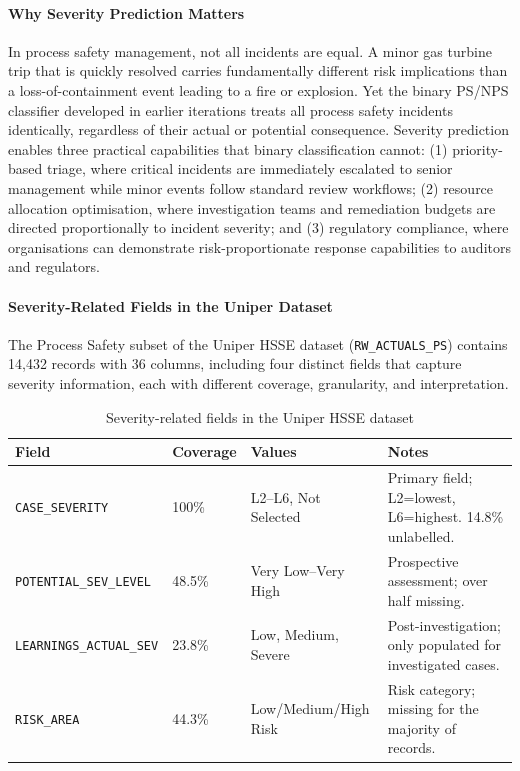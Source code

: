\documentclass[11pt, titlepage, bibliography=totoc]{scrreprt}
\begin{document}
\paragraph{Why Severity Prediction Matters}
In process safety management, not all incidents are equal. A minor gas turbine trip that is quickly resolved carries fundamentally different risk implications than a loss-of-containment event leading to a fire or explosion. Yet the binary PS/NPS classifier developed in earlier iterations treats all process safety incidents identically, regardless of their actual or potential consequence. Severity prediction enables three practical capabilities that binary classification cannot: (1) priority-based triage, where critical incidents are immediately escalated to senior management while minor events follow standard review workflows; (2) resource allocation optimisation, where investigation teams and remediation budgets are directed proportionally to incident severity; and (3) regulatory compliance, where organisations can demonstrate risk-proportionate response capabilities to auditors and regulators.

\paragraph{Severity-Related Fields in the Uniper Dataset}
The Process Safety subset of the Uniper HSSE dataset (\texttt{RW\_ACTUALS\_PS}) contains 14{,}432 records with 36 columns, including four distinct fields that capture severity information, each with different coverage, granularity, and interpretation.

\begin{table}[H]
\centering
\caption{Severity-related fields in the Uniper HSSE dataset}
\label{tab:severity_fields}
\begin{tabular}{llll}
\toprule
\textbf{Field} & \textbf{Coverage} & \textbf{Values} & \textbf{Notes} \\
\midrule
\texttt{CASE\_SEVERITY}           & 100\%  & L2--L6, Not Selected & Primary field; L2=lowest, L6=highest. 14.8\% unlabelled. \\
\texttt{POTENTIAL\_SEV\_LEVEL}    & 48.5\% & Very Low--Very High  & Prospective assessment; over half missing. \\
\texttt{LEARNINGS\_ACTUAL\_SEV}   & 23.8\% & Low, Medium, Severe  & Post-investigation; only populated for investigated cases. \\
\texttt{RISK\_AREA}               & 44.3\% & Low/Medium/High Risk & Risk category; missing for the majority of records. \\
\bottomrule
\end{tabular}
\end{table}
\end{document}
